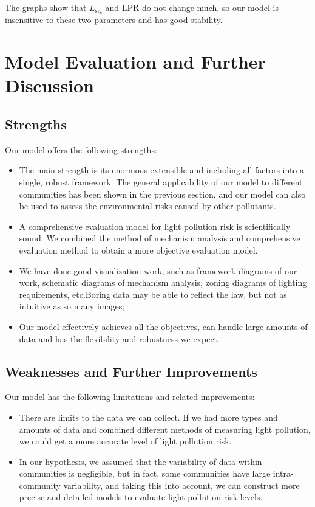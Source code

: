 \documentclass[12pt]{article}
\begin{document}
The graphs show that $L_\text{sig}$ and LPR do not change much, so our model is insensitive to these two parameters and has good stability.
\section{Model Evaluation and Further Discussion}

\subsection{Strengths}
Our model offers the following strengths: 
\begin{itemize}
	\item The main strength is its enormous extensible and including all factors into a single, robust 
framework. The general applicability of our model to different communities has been shown in the previous section, and our model can also be used to assess the environmental risks caused by other pollutants.
	\item A comprehensive evaluation model for light pollution risk is scientifically sound. We combined the method of mechanism analysis and comprehensive evaluation method to obtain a more objective evaluation model.
	\item We have done good visualization work, such as framework diagrams of our work, schematic diagrams of mechanism analysis, zoning diagrams of lighting requirements, etc.Boring data may be able to reflect the law, but not as intuitive as so many images;
        \item Our model effectively achieves all the objectives, can handle large amounts of data and has the flexibility and robustness we expect.
\end{itemize}
\subsection{Weaknesses and Further Improvements}
Our model has the following limitations and related improvements: 
\begin{itemize}
	\item There are limits to the data we can collect. If we had more types and amounts of data and combined different methods of measuring light pollution, we could get a more accurate level of light pollution risk.
	\item In our hypothesis, we assumed that the variability of data within communities is negligible, but in fact, some communities have large intra-community variability, and taking this into account, we can construct more precise and detailed models to evaluate light pollution risk levels.
\end{itemize}
\end{document}
